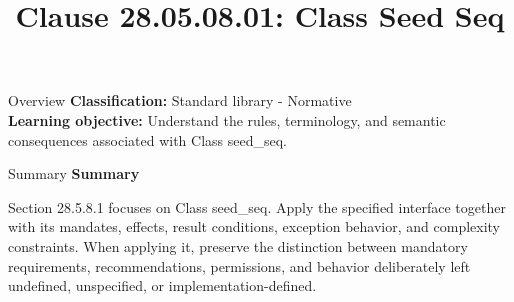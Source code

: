 \documentclass[10pt,letterpaper]{article}
\title{Clause 28.05.08.01: Class Seed Seq}
\author{}
\date{}
\begin{document}
\maketitle
\begin{CornellOverviewBox}{Overview}
\textbf{Classification:} Standard library - Normative\\[2pt]
\textbf{Learning objective:} Understand the rules, terminology, and semantic consequences associated with Class seed\_seq.
\end{CornellOverviewBox}\begin{CornellSummaryBox}{Summary}
{\sffamily\bfseries\color{Accent} Summary}\par\vspace{3pt}Section 28.5.8.1 focuses on Class seed\_seq. Apply the specified interface together with its mandates, effects, result conditions, exception behavior, and complexity constraints. When applying it, preserve the distinction between mandatory requirements, recommendations, permissions, and behavior deliberately left undefined, unspecified, or implementation-defined.
\end{CornellSummaryBox}
\end{document}
